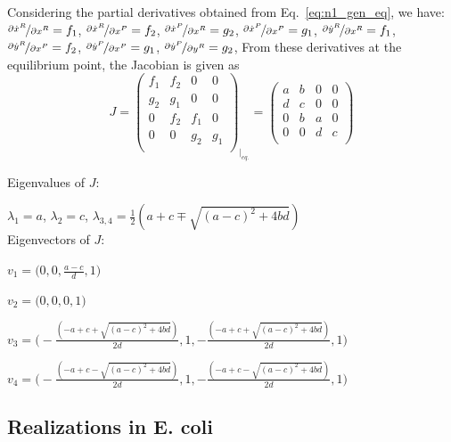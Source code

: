\documentclass[12pt]{article}
\begin{document}
Considering the partial derivatives obtained from 
Eq.~\ref{eq:n1_gen_eq}, we have:
$\nicefrac{\partial \dot{x}^R}{\partial {x}^R} = f_1$,
$\nicefrac{\partial \dot{x}^R}{\partial {x}^P} = f_2$,
$\nicefrac{\partial \dot{x}^P}{\partial {x}^R} = g_2$,
$\nicefrac{\partial \dot{x}^P}{\partial {x}^P} = g_1$,
$\nicefrac{\partial \dot{y}^R}{\partial {x}^R} = f_1$,
$\nicefrac{\partial \dot{y}^R}{\partial {x}^P} = f_2$,
$\nicefrac{\partial \dot{y}^P}{\partial {x}^P} = g_1$,
$\nicefrac{\partial \dot{y}^P}{\partial {y}^R} = g_2$,
From these derivatives at the equilibrium point, the 
Jacobian is given as
\begin{equation}
    J = \begin{pmatrix}
        f_1 & f_2 & 0 & 0 \\
        g_2 & g_1 & 0 & 0 \\
        0 & f_2 & f_1 & 0 \\
        0 & 0 & g_2 & g_1 \\
    \end{pmatrix}_{\big|_{eq.}} =
    \begin{pmatrix}
        a & b & 0 & 0 \\
        d & c & 0 & 0 \\
        0 & b & a & 0 \\
        0 & 0 & d & c \\ 
    \end{pmatrix}
\end{equation}

Eigenvalues of $J$:

$\lambda_1 = a$, $\lambda_2 = c$, 
$\lambda_{3,4} = \frac{1}{2}(a+c \mp \sqrt{(a-c)^2 + 4bd})$\\[0.2cm]

Eigenvectors of $J$:

$ v_1 = \Big( 0, 0, \frac{a-c}{d}, 1 \Big)$

$ v_2 = \Big( 0, 0, 0, 1 \Big)$

$ v_3 = \Big( -\frac{(-a + c + \sqrt{(a-c)^2 + 4bd})}{2d}, 
        1, -\frac{(-a + c + \sqrt{(a-c)^2 + 4bd})}{2d}, 1 \Big)$

$ v_4 = \Big( -\frac{(-a + c - \sqrt{(a-c)^2 + 4bd})}{2d}, 
        1, -\frac{(-a + c - \sqrt{(a-c)^2 + 4bd})}{2d}, 1 \Big)$\\[0.2cm]

\subsection{Realizations in E. coli}
\end{document}
